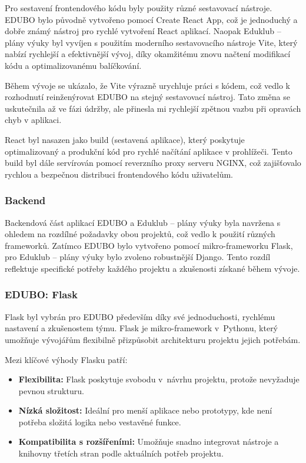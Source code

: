 \documentclass[male,czech,api_bc]{kitheses}
\begin{document}
Pro sestavení frontendového kódu byly použity různé sestavovací nástroje. EDUBO bylo původně vytvořeno pomocí Create React App, což je jednoduchý a dobře známý nástroj pro rychlé vytvoření React aplikací. Naopak Eduklub – plány výuky byl vyvíjen s použitím moderního sestavovacího nástroje Vite, který nabízí rychlejší a efektivnější vývoj, díky okamžitému znovu načtení modifikací kódu a optimalizovanému balíčkování.

Během vývoje se ukázalo, že Vite výrazně urychluje práci s kódem, což vedlo k rozhodnutí reinženýrovat EDUBO na stejný sestavovací nástroj. Tato změna se uskutečnila až ve fázi údržby, ale přinesla mi rychlejší zpětnou vazbu při opravách chyb v aplikaci.

React byl nasazen jako build (sestavená aplikace), který poskytuje optimalizovaný a produkční kód pro rychlé načítání aplikace v prohlížeči. Tento build byl dále servírován pomocí reverzního proxy serveru NGINX, což zajišťovalo rychlou a bezpečnou distribuci frontendového kódu uživatelům.

\subsubsection{Backend}

Backendová část aplikací EDUBO a Eduklub – plány výuky byla navržena s ohledem na rozdílné požadavky obou projektů, což vedlo k použití různých frameworků. Zatímco EDUBO bylo vytvořeno pomocí mikro-frameworku Flask, pro Eduklub – plány výuky bylo zvoleno robustnější Django. Tento rozdíl reflektuje specifické potřeby každého projektu a zkušenosti získané během vývoje.

\subsubsection{EDUBO: Flask}

Flask byl vybrán pro EDUBO především díky své jednoduchosti, rychlému nastavení a zkušenostem týmu. Flask je mikro-framework v~Pythonu, který umožňuje vývojářům flexibilně přizpůsobit architekturu projektu jejich potřebám.

Mezi klíčové výhody Flasku patří:
\begin{itemize}
	\item \textbf{Flexibilita:} Flask poskytuje svobodu v~návrhu projektu, protože nevyžaduje pevnou strukturu.
	\item \textbf{Nízká složitost:} Ideální pro menší aplikace nebo prototypy, kde není potřeba složitá logika nebo vestavěné funkce.
	\item \textbf{Kompatibilita s rozšířeními:} Umožňuje snadno integrovat nástroje a knihovny třetích stran podle aktuálních potřeb projektu.
\end{itemize}
\end{document}
